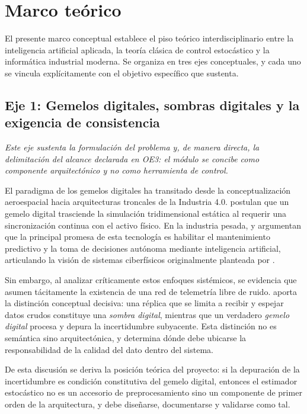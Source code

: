 \section{Marco teórico}
\label{sec:marco}

El presente marco conceptual establece el piso teórico interdisciplinario entre
la inteligencia artificial aplicada, la teoría clásica de control estocástico y
la informática industrial moderna. Se organiza en tres ejes conceptuales, y cada
uno se vincula explícitamente con el objetivo específico que sustenta.

\subsection{Eje 1: Gemelos digitales, sombras digitales y la exigencia de
consistencia}
\label{sec:marco-eje1}

\emph{Este eje sustenta la formulación del problema y, de manera directa, la
delimitación del alcance declarada en OE3: el módulo se concibe como componente
arquitectónico y no como herramienta de control.}

El paradigma de los gemelos digitales ha transitado desde la conceptualización
aeroespacial hacia arquitecturas troncales de la Industria 4.0.
\textcite{fuller2020} postulan que un gemelo digital trasciende la simulación
tridimensional estática al requerir una sincronización continua con el activo
físico. En la industria pesada, \textcite{tao2019} y \textcite{liu2021}
argumentan que la principal promesa de esta tecnología es habilitar el
mantenimiento predictivo y la toma de decisiones autónoma mediante inteligencia
artificial, articulando la visión de sistemas ciberfísicos originalmente
planteada por \textcite{lee2008}.

Sin embargo, al analizar críticamente estos enfoques sistémicos, se evidencia
que asumen tácitamente la existencia de una red de telemetría libre de ruido.
\textcite{sepasgozar2021} aporta la distinción conceptual decisiva: una réplica
que se limita a recibir y espejar datos crudos constituye una \emph{sombra
digital}, mientras que un verdadero \emph{gemelo digital} procesa y depura la
incertidumbre subyacente. Esta distinción no es semántica sino arquitectónica, y
determina dónde debe ubicarse la responsabilidad de la calidad del dato dentro
del sistema.

De esta discusión se deriva la posición teórica del proyecto: si la depuración
de la incertidumbre es condición constitutiva del gemelo digital, entonces el
estimador estocástico no es un accesorio de preprocesamiento sino un componente
de primer orden de la arquitectura, y debe diseñarse, documentarse y validarse
como tal.

